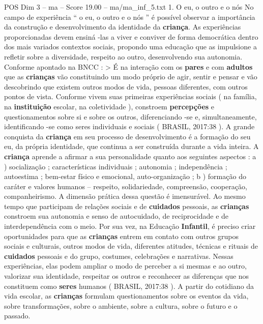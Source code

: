 \begin{textsample}{POS Dim 3 – ma – Score 19.00 – ma/ma\_inf\_5.txt}  \label{ex:f3_pos_145}
1.
O eu, o outro e o nós No campo de experiência “ o eu, o outro e o nós ” é possível observar a importância da construção e desenvolvimento da identidade da \textbf{criança}.
As experiências proporcionadas devem ensiná -las a viver e conviver de forma democrática dentro dos mais variados contextos sociais, propondo uma educação que as impulsione a refletir sobre a diversidade, respeito ao outro, desenvolvendo sua autonomia.
Conforme apontado na BNCC : > É na interação com os \textbf{pares} e com \textbf{adultos} que as \textbf{crianças} vão constituindo um modo próprio de agir, sentir e pensar e vão descobrindo que existem outros modos de vida, pessoas diferentes, com outros pontos de vista.
Conforme vivem suas primeiras experiências sociais ( na família, na \textbf{instituição} escolar, na coletividade ), constroem \textbf{percepções} e questionamentos sobre si e sobre os outros, diferenciando -se e, simultaneamente, identificando -se como seres individuais e sociais ( BRASIL, 2017:38 ).
A grande conquista da \textbf{criança} em seu processo de desenvolvimento é a formação do seu eu, da própria identidade, que continua a ser construída durante a vida inteira.
A \textbf{criança} aprende a afirmar a sua personalidade quanto aos seguintes aspectos : a ) socialização ; características individuais ; autonomia ; independência ; autoestima ; bem-estar físico e emocional, auto-organização ; b ) formação do caráter e valores humanos – respeito, solidariedade, compreensão, cooperação, companheirismo.
A dimensão prática dessa questão é imensurável.
Ao mesmo tempo que participam de relações sociais e de \textbf{cuidados} pessoais, as \textbf{crianças} constroem sua autonomia e senso de autocuidado, de reciprocidade e de interdependência com o meio.
Por sua vez, na Educação \textbf{Infantil}, é preciso criar oportunidades para que as \textbf{crianças} entrem em contato com outros grupos sociais e culturais, outros modos de vida, diferentes atitudes, técnicas e rituais de \textbf{cuidados} pessoais e do grupo, costumes, celebrações e narrativas.
Nessas experiências, elas podem ampliar o modo de perceber a si mesmas e ao outro, valorizar sua identidade, respeitar os outros e reconhecer as diferenças que nos constituem como \textbf{seres} humanos ( BRASIL, 2017:38 ).
A partir do cotidiano da vida escolar, as \textbf{crianças} formulam questionamentos sobre os eventos da vida, sobre transformações, sobre o ambiente, sobre a cultura, sobre o futuro e o passado.

\end{textsample}
